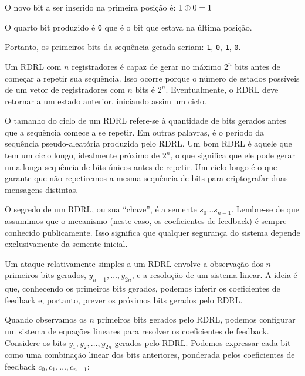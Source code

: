 \begin{example}
\begin{center}
\end{center}

O novo bit a ser inserido na primeira posição é: $1 \oplus 0 = 1$

O quarto bit produzido é {\tt 0} que é o bit que estava na última posição.

Portanto, os primeiros bits da sequência gerada seriam: {\tt 1}, {\tt 0}, {\tt 1}, {\tt 0}.

\end{example}

Um RDRL com $n$ registradores é capaz de gerar no máximo $2^n$ bits antes de começar a repetir sua sequência.
Isso ocorre porque o número de estados possíveis de um vetor de registradores com $n$ bits é $2^n$.
Eventualmente, o RDRL deve retornar a um estado anterior, iniciando assim um ciclo.

O tamanho do ciclo de um RDRL refere-se à quantidade de bits gerados antes que a sequência comece a se repetir.
Em outras palavras, é o período da sequência pseudo-aleatória produzida pelo RDRL.
Um bom RDRL é aquele que tem um ciclo longo, idealmente próximo de $2^n$, o que significa que ele pode gerar uma longa sequência de bits únicos antes de repetir.
Um ciclo longo é o que garante que não repetiremos a mesma sequência de bits para criptografar duas mensagens distintas.

O segredo de um RDRL, ou sua ``chave'', é a semente $s_0 \dots s_{n-1}$.
Lembre-se de que assumimos que o mecanismo (neste caso, os coeficientes de feedback) é sempre conhecido publicamente. Isso significa que qualquer segurança do sistema depende exclusivamente da semente inicial.

Um ataque relativamente simples a um RDRL envolve a observação dos $n$ primeiros bits gerados, \(y_{n+1}, \dots, y_{2n}\), e a resolução de um sistema linear.
A ideia é que, conhecendo os primeiros bits gerados, podemos inferir os coeficientes de feedback e, portanto, prever os próximos bits gerados pelo RDRL.

Quando observamos os $n$ primeiros bits gerados pelo RDRL, podemos configurar um sistema de equações lineares para resolver os coeficientes de feedback.
Considere os bits $y_1, y_2, \dots, y_{2n}$ gerados pelo RDRL.
Podemos expressar cada bit como uma combinação linear dos bits anteriores, ponderada pelos coeficientes de feedback $c_0, c_1, \dots, c_{n-1}$:

